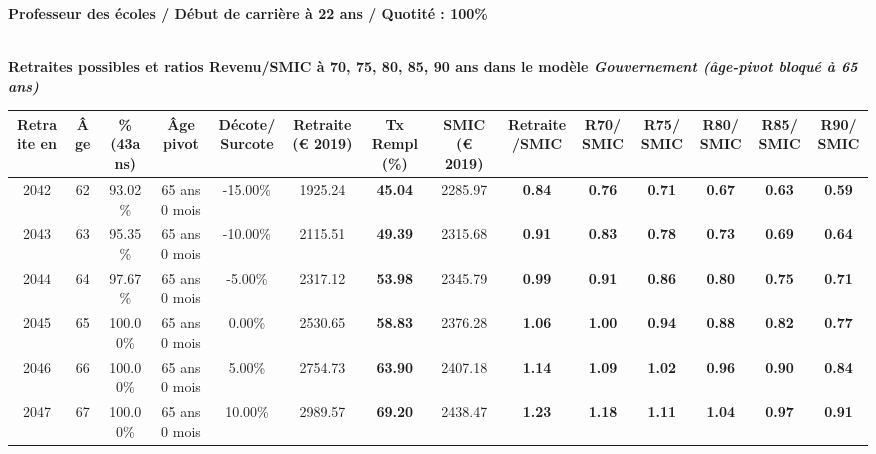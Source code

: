 {\bf \noindent Professeur des écoles / Début de carrière à 22 ans / Quotité : 100\%}  ~ 

 ~\\{\bf \noindent Retraites possibles et ratios Revenu/SMIC à 70, 75, 80, 85, 90 ans dans le modèle \emph{Gouvernement (âge-pivot bloqué à 65 ans)}}  
 
\begin{adjustbox}{max width=\textwidth} 
\begin{tabular}[htb]{|c|c||c|c|c||c|c||c|c||c|c|c|c|c|} 
\hline 
 Retraite en &  Âge &  \%(43ans) &  Âge pivot &  Décote/Surcote &  Retraite (\euro{} 2019) &  Tx Rempl(\%) &  SMIC (\euro{} 2019) &  Retraite/SMIC &  R70/SMIC &  R75/SMIC &  R80/SMIC &  R85/SMIC &  R90/SMIC \\ 
\hline \hline 
 2042 &  62 &  93.02\% &  65 ans 0 mois &  -15.00\% &  1925.24 &  {\bf 45.04} &  2285.97 &  {\bf {\color{red} 0.84}} &  {\bf {\color{red} 0.76}} &  {\bf {\color{red} 0.71}} &  {\bf {\color{red} 0.67}} &  {\bf {\color{red} 0.63}} &  {\bf {\color{red} 0.59}} \\ 
\hline 
 2043 &  63 &  95.35\% &  65 ans 0 mois &  -10.00\% &  2115.51 &  {\bf 49.39} &  2315.68 &  {\bf {\color{red} 0.91}} &  {\bf {\color{red} 0.83}} &  {\bf {\color{red} 0.78}} &  {\bf {\color{red} 0.73}} &  {\bf {\color{red} 0.69}} &  {\bf {\color{red} 0.64}} \\ 
\hline 
 2044 &  64 &  97.67\% &  65 ans 0 mois &  -5.00\% &  2317.12 &  {\bf 53.98} &  2345.79 &  {\bf {\color{red} 0.99}} &  {\bf {\color{red} 0.91}} &  {\bf {\color{red} 0.86}} &  {\bf {\color{red} 0.80}} &  {\bf {\color{red} 0.75}} &  {\bf {\color{red} 0.71}} \\ 
\hline 
 2045 &  65 &  100.00\% &  65 ans 0 mois &  0.00\% &  2530.65 &  {\bf 58.83} &  2376.28 &  {\bf 1.06} &  {\bf {\color{red} 1.00}} &  {\bf {\color{red} 0.94}} &  {\bf {\color{red} 0.88}} &  {\bf {\color{red} 0.82}} &  {\bf {\color{red} 0.77}} \\ 
\hline 
 2046 &  66 &  100.00\% &  65 ans 0 mois &  5.00\% &  2754.73 &  {\bf 63.90} &  2407.18 &  {\bf 1.14} &  {\bf 1.09} &  {\bf 1.02} &  {\bf {\color{red} 0.96}} &  {\bf {\color{red} 0.90}} &  {\bf {\color{red} 0.84}} \\ 
\hline 
 2047 &  67 &  100.00\% &  65 ans 0 mois &  10.00\% &  2989.57 &  {\bf 69.20} &  2438.47 &  {\bf 1.23} &  {\bf 1.18} &  {\bf 1.11} &  {\bf 1.04} &  {\bf {\color{red} 0.97}} &  {\bf {\color{red} 0.91}} \\ 
\hline 
\hline 
\end{tabular} 
\end{adjustbox} 
 

